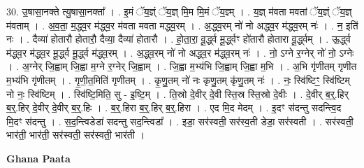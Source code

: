 \documentclass[17pt]{extarticle}
\begin{document}
30. उ॒षासा॒नक्ते त्यु॒षासा॒नक्ता᳚ । . इ॒मं ॅय॒ज्ञ्ं ॅय॒ज्ञ् मि॒म मि॒मं ॅय॒ज्ञ्म् । . य॒ज्ञ् म॑वता मवतां ॅय॒ज्ञ्ं ॅय॒ज्ञ् म॑वताम् । . अ॒व॒ता॒ म॒द्ध्व॒र म॑द्ध्व॒र म॑वता मवता मद्ध्व॒रम् । . अ॒द्ध्व॒रम् नो॑ नो अद्ध्व॒र म॑द्ध्व॒रम् नः॑ । . न॒ इति॑ नः । . दैव्या॑ होतारौ होतारौ॒ दैव्या॒ दैव्या॑ होतारौ । . हो॒ता॒रा॒ वू॒र्द्ध्व मू॒र्द्ध्वꣳ हो॑तारौ होतारा वू॒र्द्ध्वम् । . ऊ॒र्द्ध्व म॑द्ध्व॒र म॑द्ध्व॒र मू॒र्द्ध्व मू॒र्द्ध्व म॑द्ध्व॒रम् । . अ॒द्ध्व॒रम् नो॑ नो अद्ध्व॒र म॑द्ध्व॒रम् नः॑ । . नो॒ ऽग्ने र॒ग्नेर् नो॑ नो॒ ऽग्नेः । . अ॒ग्नेर् जि॒ह्वाम् जि॒ह्वा म॒ग्ने र॒ग्नेर् जि॒ह्वाम् । . जि॒ह्वा म॒भ्य॑भि जि॒ह्वाम् जि॒ह्वा म॒भि । . अ॒भि गृ॑णीतम् गृणीत म॒भ्य॑भि गृ॑णीतम् । . गृ॒णी॒त॒मिति॑ गृणीतम् । . कृ॒णु॒तम् नो॑ नः कृणु॒तम् कृ॑णु॒तम् नः॑ । . नः॒ स्वि॑ष्टिꣳ॒॒ स्वि॑ष्टिम् नो नः॒ स्वि॑ष्टिम् । . स्वि॑ष्टि॒मिति॒ सु - इ॒ष्टि॒म् । . ति॒स्रो दे॒वीर् दे॒वी स्ति॒स्र स्ति॒स्रो दे॒वीः । . दे॒वीर् ब॒र्॒.हिर् ब॒र्॒.हिर् दे॒वीर् दे॒वीर् ब॒र्॒.हिः । . ब॒र्॒.हिरा ब॒र्॒.हिर् ब॒र्॒.हिरा । . एद मि॒द मेदम् । . इ॒दꣳ स॑दन्तु सदन्त्वि॒द मि॒दꣳ स॑दन्तु । . स॒द॒न्त्विडेडा॑ सदन्तु सद॒न्त्विडा᳚ । . इडा॒ सर॑स्वती॒ सर॑स्व॒ती डेडा॒ सर॑स्वती । . सर॑स्वती॒ भार॑ती॒ भार॑ती॒ सर॑स्वती॒ सर॑स्वती॒ भार॑ती । \newline

\textbf{Ghana Paata } \newline
\end{document}
